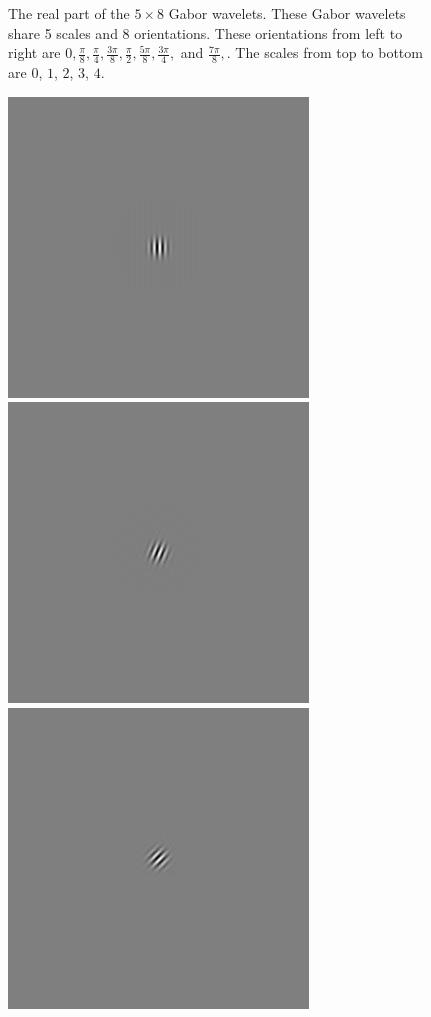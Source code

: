 \begin{figure}
\begin{center}
\end{center}
\caption{The real part of the $5\times8$ Gabor wavelets. These Gabor wavelets share 5 scales and 8 orientations. These orientations from left to right are $0,\frac{\pi}{8},\frac{\pi}{4},\frac{3\pi}{8},\frac{\pi}{2},\frac{5\pi}{8},\frac{3\pi}{4},$ and $\frac{7\pi}{8},$. The scales from top to bottom are $0$, $1$, $2$, $3$, $4$.}
\label{fig:realgabor}
\end{figure} 



\begin{figure}
 \begin{center}
 \includegraphics[scale=0.1]{ch4/figures/iGabor0_0.jpg}
 \includegraphics[scale=0.1]{ch4/figures/iGabor0_1.jpg}
 \includegraphics[scale=0.1]{ch4/figures/iGabor0_2.jpg}

\end{center}
\end{figure}
